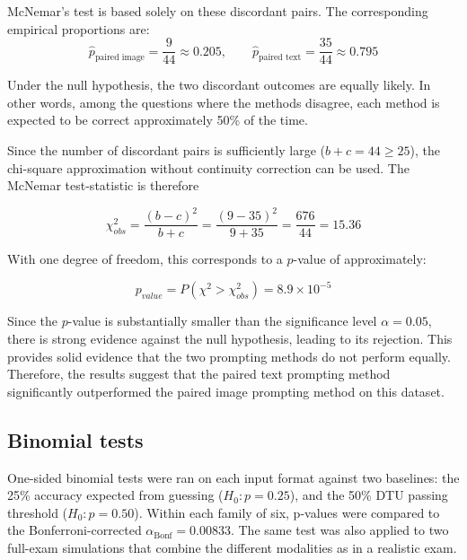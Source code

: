 \documentclass{article}
\begin{document}
McNemar’s test is based solely on these discordant pairs. The corresponding empirical proportions are:
\[
\hat{p}_{\text{paired image}} = \frac{9}{44} \approx 0.205,
\qquad
\hat{p}_{\text{paired text}} = \frac{35}{44} \approx 0.795
\]

Under the null hypothesis, the two discordant outcomes are equally likely. In other words, among the questions where the methods disagree, each method is expected to be correct approximately 50\% of the time.

Since the number of discordant pairs is sufficiently large (\(b+c=44 \geq 25\)), the chi-square approximation without continuity correction can be used. The McNemar test-statistic is therefore

\[
\chi_{obs}^2
=
\frac{(b-c)^2}{b+c}
=
\frac{(9-35)^2}{9+35}
=
\frac{676}{44}
=
15.36
\]

With one degree of freedom, this corresponds to a \(p\)-value of approximately:

\[
p_{value} = P(\chi^2 > \chi^2_{obs}) =8.9 \times 10^{-5}
\]

Since the $p$-value is substantially smaller than the significance level $\alpha = 0.05$, there is strong evidence against the null hypothesis, leading to its rejection. This provides solid evidence that the two prompting methods do not perform equally. Therefore, the results suggest that the paired text prompting method significantly outperformed the paired image prompting method on this dataset.


\subsection{Binomial tests}

One-sided binomial tests were ran on each input format against two baselines: the 25\% accuracy expected from guessing ($H_0: p = 0.25$), and the 50\% DTU passing threshold ($H_0: p = 0.50$). Within each family of six, p-values were compared to the Bonferroni-corrected $\alpha_{\text{Bonf}}=0.00833$. The same test was also applied to two full-exam simulations that combine the different modalities as in a realistic exam.
\end{document}
